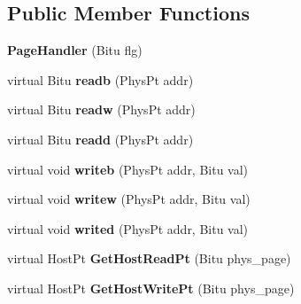 \subsection*{Public Member Functions}
\begin{DoxyCompactItemize}
\item 
\hypertarget{classPageHandler_a009efc4a2c49e562c8a0e0dca2bb91eb}{{\bfseries Page\-Handler} (Bitu flg)}\label{classPageHandler_a009efc4a2c49e562c8a0e0dca2bb91eb}

\item 
\hypertarget{classPageHandler_a741d1800da3de891f7e7d1ef921f92f5}{virtual Bitu {\bfseries readb} (Phys\-Pt addr)}\label{classPageHandler_a741d1800da3de891f7e7d1ef921f92f5}

\item 
\hypertarget{classPageHandler_a220266243629d1c0d4e1222be817471b}{virtual Bitu {\bfseries readw} (Phys\-Pt addr)}\label{classPageHandler_a220266243629d1c0d4e1222be817471b}

\item 
\hypertarget{classPageHandler_a0a0ee09fb7fface5af93f25d110d6661}{virtual Bitu {\bfseries readd} (Phys\-Pt addr)}\label{classPageHandler_a0a0ee09fb7fface5af93f25d110d6661}

\item 
\hypertarget{classPageHandler_aa848d57a4a20808815f179c9af8a44dc}{virtual void {\bfseries writeb} (Phys\-Pt addr, Bitu val)}\label{classPageHandler_aa848d57a4a20808815f179c9af8a44dc}

\item 
\hypertarget{classPageHandler_a297027c1a4430d5afe642a4ffaf04473}{virtual void {\bfseries writew} (Phys\-Pt addr, Bitu val)}\label{classPageHandler_a297027c1a4430d5afe642a4ffaf04473}

\item 
\hypertarget{classPageHandler_aebd9846b268b5844113039e60b564539}{virtual void {\bfseries writed} (Phys\-Pt addr, Bitu val)}\label{classPageHandler_aebd9846b268b5844113039e60b564539}

\item 
\hypertarget{classPageHandler_aec146fc4be69c0f37707c97aa1d9d7a2}{virtual Host\-Pt {\bfseries Get\-Host\-Read\-Pt} (Bitu phys\-\_\-page)}\label{classPageHandler_aec146fc4be69c0f37707c97aa1d9d7a2}

\item 
\hypertarget{classPageHandler_a9be437d29e87536d012d4520cb3ec52d}{virtual Host\-Pt {\bfseries Get\-Host\-Write\-Pt} (Bitu phys\-\_\-page)}\label{classPageHandler_a9be437d29e87536d012d4520cb3ec52d}


\end{DoxyCompactItemize}
